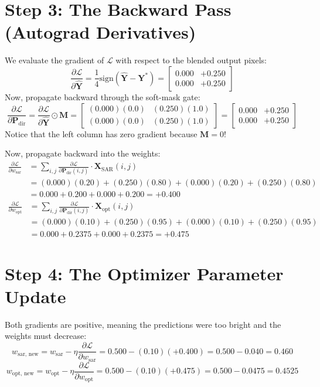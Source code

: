 \section{Step 3: The Backward Pass (Autograd Derivatives)}
We evaluate the gradient of $\mathcal{L}$ with respect to the blended output pixels:
\[
\frac{\partial \mathcal{L}}{\partial \hat{\mathbf{Y}}} = \frac{1}{4} \text{sign}(\hat{\mathbf{Y}} - \mathbf{Y}^*) = \begin{bmatrix} 0.000 & +0.250 \\ 0.000 & +0.250 \end{bmatrix}
\]
Now, propagate backward through the soft-mask gate:
\[
\frac{\partial \mathcal{L}}{\partial \mathbf{P}_{\text{dir}}} = \frac{\partial \mathcal{L}}{\partial \hat{\mathbf{Y}}} \odot \mathbf{M} = \begin{bmatrix} (0.000)(0.0) & (0.250)(1.0) \\ (0.000)(0.0) & (0.250)(1.0) \end{bmatrix} = \begin{bmatrix} 0.000 & +0.250 \\ 0.000 & +0.250 \end{bmatrix}
\]
Notice that the left column has zero gradient because $\mathbf{M} = 0$!

Now, propagate backward into the weights:
\begin{align*}
\frac{\partial \mathcal{L}}{\partial w_{\text{sar}}} &= \sum_{i,j} \frac{\partial \mathcal{L}}{\partial \mathbf{P}_{\text{dir}}(i,j)} \cdot \mathbf{X}_{\text{SAR}}(i,j) \\
&= (0.000)(0.20) + (0.250)(0.80) + (0.000)(0.20) + (0.250)(0.80) \\
&= 0.000 + 0.200 + 0.000 + 0.200 = \mathbf{+0.400}
\end{align*}
\begin{align*}
\frac{\partial \mathcal{L}}{\partial w_{\text{opt}}} &= \sum_{i,j} \frac{\partial \mathcal{L}}{\partial \mathbf{P}_{\text{dir}}(i,j)} \cdot \mathbf{X}_{\text{opt}}(i,j) \\
&= (0.000)(0.10) + (0.250)(0.95) + (0.000)(0.10) + (0.250)(0.95) \\
&= 0.000 + 0.2375 + 0.000 + 0.2375 = \mathbf{+0.475}
\end{align*}

\section{Step 4: The Optimizer Parameter Update}
Both gradients are positive, meaning the predictions were too bright and the weights must decrease:
\[
w_{\text{sar, new}} = w_{\text{sar}} - \eta \frac{\partial \mathcal{L}}{\partial w_{\text{sar}}} = 0.500 - (0.10)(+0.400) = 0.500 - 0.040 = \mathbf{0.460}
\]
\[
w_{\text{opt, new}} = w_{\text{opt}} - \eta \frac{\partial \mathcal{L}}{\partial w_{\text{opt}}} = 0.500 - (0.10)(+0.475) = 0.500 - 0.0475 = \mathbf{0.4525}
\]

